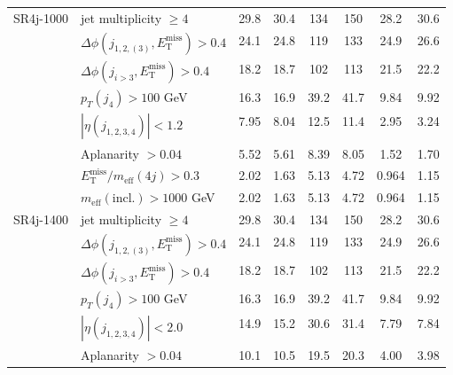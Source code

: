 \documentclass[10pt,fleqn]{article}
\newcommand{\met}{E^\mathrm{miss}_\mathrm{T}}
\newcommand{\meff}{m_\mathrm{eff}}
\begin{document}
\begin{table}[h!]
\begin{tabular}{c|l|c|c|c|c|c|c}
SR4j-1000    & jet multiplicity $\geq 4$                       &     29.8   &   30.4    &  134       &   150     &      28.2    &   30.6         \\
             & $\Delta\phi(j_{1,2,(3)},\met) > 0.4$            &     24.1   &   24.8    &  119       &   133     &      24.9    &   26.6         \\
             & $\Delta\phi(j_{i>3},\met) > 0.4$                &     18.2   &   18.7    &  102       &   113     &      21.5    &   22.2         \\
             & $p_T(j_4) > 100$ GeV                            &     16.3   &   16.9    &  39.2      &   41.7    &      9.84    &   9.92         \\      
             & $|\eta(j_{1,2,3,4})|< 1.2$                      &     7.95   &   8.04    &  12.5      &   11.4    &      2.95    &   3.24         \\           
             & Aplanarity $> 0.04$                             &     5.52   &   5.61    &  8.39      &   8.05    &      1.52    &   1.70         \\           
             & $\met/\meff(4j) > 0.3$                          &     2.02   &   1.63    &  5.13      &   4.72    &      0.964   &   1.15         \\    
             & $\meff(\mathrm{incl.}) > 1000$ GeV              &     2.02   &   1.63    &  5.13      &   4.72    &      0.964   &   1.15         \\ \midrule                 
SR4j-1400    & jet multiplicity $\geq 4$                       &     29.8   &   30.4    &  134       &   150     &      28.2    &   30.6         \\
             & $\Delta\phi(j_{1,2,(3)},\met) > 0.4$            &     24.1   &   24.8    &  119       &   133     &      24.9    &   26.6         \\
             & $\Delta\phi(j_{i>3},\met) > 0.4$                &     18.2   &   18.7    &  102       &   113     &      21.5    &   22.2         \\
             & $p_T(j_4) > 100$ GeV                            &     16.3   &   16.9    &  39.2      &   41.7    &      9.84    &   9.92         \\      
             & $|\eta(j_{1,2,3,4})|< 2.0$                      &     14.9   &   15.2    &  30.6      &   31.4    &      7.79    &   7.84         \\           
             & Aplanarity $> 0.04$                             &     10.1   &   10.5    &  19.5      &   20.3    &      4.00    &   3.98         \\           

\end{tabular}
\end{table}
\end{document}
